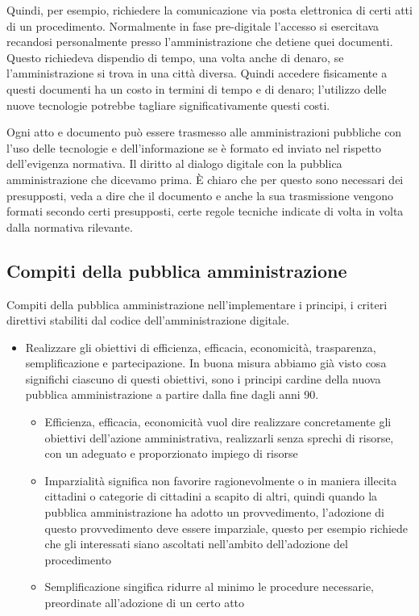 Quindi, per esempio, richiedere  la comunicazione via posta elettronica di certi atti di un procedimento. Normalmente in fase pre-digitale l'accesso si esercitava recandosi personalmente presso l'amministrazione che detiene quei documenti. Questo richiedeva dispendio di tempo, una volta anche di denaro, se l'amministrazione si trova in una città diversa. Quindi accedere fisicamente a questi documenti ha un costo in termini di tempo e di denaro; l'utilizzo delle nuove tecnologie potrebbe tagliare significativamente questi costi. 

Ogni atto e documento può essere trasmesso alle amministrazioni pubbliche con l'uso delle tecnologie e dell'informazione se è formato ed inviato nel rispetto dell'evigenza normativa. Il diritto al dialogo digitale con la pubblica amministrazione che dicevamo prima. È chiaro che per questo sono necessari dei presupposti, veda a dire che il documento e anche la sua trasmissione vengono formati secondo certi presupposti, certe regole tecniche indicate di volta in volta dalla normativa rilevante. 

\subsection{Compiti della pubblica amministrazione}
Compiti della pubblica amministrazione nell'implementare i principi, i criteri direttivi stabiliti dal codice dell'amministrazione digitale. 

\begin{itemize}
    \item Realizzare gli obiettivi di efficienza, efficacia, economicità, trasparenza, semplificazione e partecipazione. In buona misura abbiamo già visto cosa significhi ciascuno di questi obiettivi, sono i principi cardine della nuova pubblica amministrazione a partire dalla fine dagli anni 90. 



    \begin{itemize}
        \item Efficienza, efficacia, economicità vuol dire realizzare concretamente gli obiettivi dell'azione amministrativa, realizzarli senza sprechi di risorse, con un adeguato e proporzionato impiego di risorse
        \item Imparzialità significa non favorire ragionevolmente o in maniera illecita cittadini o categorie di cittadini a scapito di altri, quindi quando la pubblica amministrazione ha adotto un provvedimento, l'adozione di questo provvedimento deve essere imparziale, questo per esempio richiede che gli interessati siano ascoltati nell'ambito dell'adozione del procedimento
        \item  Semplificazione singifica ridurre al minimo le procedure necessarie, preordinate all'adozione di un certo atto
    \end{itemize}
\end{itemize}


